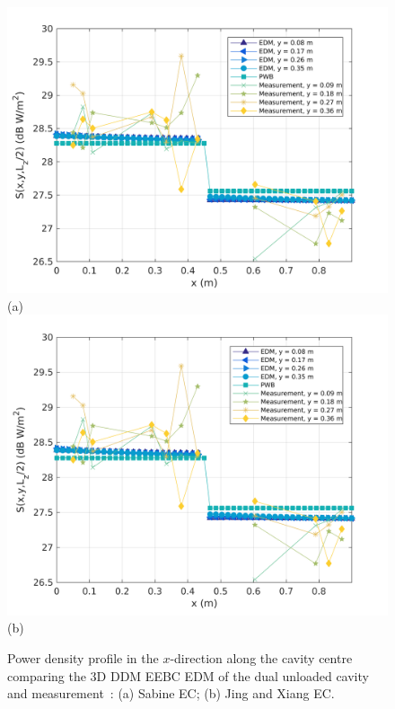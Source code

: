 \documentclass[a4paper]{article}
\numberwithin{equation}{section}
\begin{document}
\begin{figure}[hp]
\begin{center}
\includegraphics[width=0.6\linewidth]{figures/DDM-EEBC_3D_DU_PowerDensityProfileXMeas}\\
{\footnotesize (a)}\\
\vspace{2mm}
\includegraphics[width=0.6\linewidth]{figures/DDM-EEBC_3D_DU_PowerDensityProfileXMeas_JX}\\
{\footnotesize (b)}\\
\vspace{-2mm}
\caption{\label{fg:measprofsdu} Power density profile in the $x$-direction along the cavity centre comparing
the 3D DDM EEBC EDM of the dual unloaded cavity and measurement~\citep{Flintoft2017b}: (a) Sabine EC; (b) Jing and Xiang EC.}
\end{center}
\end{figure}
\end{document}
